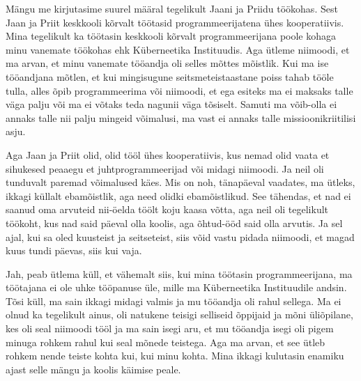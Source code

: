 
Mängu me kirjutasime suurel määral tegelikult Jaani 
ja Priidu töökohas. Sest Jaan ja Priit keskkooli 
kõrvalt töötasid programmeerijatena ühes kooperatiivis. Mina tegelikult ka 
töötasin keskkooli kõrvalt programmeerijana poole kohaga minu vanemate töökohas 
ehk Küberneetika Instituudis. Aga  ütleme 
niimoodi, et ma arvan, et  minu vanemate tööandja oli selles mõttes mõistlik. 
Kui ma ise tööandjana mõtlen, et kui mingisugune seitsmeteistaastane poiss 
tahab tööle tulla,  alles õpib programmeerima või niimoodi, et ega esiteks ma 
ei maksaks talle väga palju või ma ei võtaks teda nagunii väga tõsiselt.  
Samuti ma võib-olla ei annaks talle nii palju mingeid võimalusi, ma vast ei 
annaks talle missioonikriitilisi asju. 

Aga Jaan ja Priit olid, olid tööl ühes kooperatiivis, kus nemad olid vaata et 
sihukesed peaaegu et juhtprogrammeerijad või midagi niimoodi.  Ja neil oli 
tunduvalt paremad võimalused  käes. Mis on noh, tänapäeval vaadates, ma ütleks, 
ikkagi küllalt ebamõistlik, aga need olidki  ebamõistlikud. See tähendas, et 
nad ei saanud oma arvuteid nii-öelda töölt koju kaasa võtta, aga neil oli 
tegelikult töökoht, kus nad said päeval  olla koolis, aga õhtud-ööd said olla 
arvutis. Ja sel ajal,  kui sa oled kuusteist ja seitseteist, siis võid vastu 
pidada niimoodi, et magad kuus tundi päevas, siis kui vaja.


Jah, peab ütlema küll,  et vähemalt siis, kui mina töötasin programmeerijana, 
ma töötajana ei ole uhke tööpanuse üle, mille ma Küberneetika Instituudile 
andsin. Tõsi küll,  ma sain ikkagi midagi valmis 
ja mu tööandja oli rahul sellega. Ma ei olnud ka tegelikult ainus, oli natukene 
teisigi selliseid õppijaid ja mõni üliõpilane, kes oli seal niimoodi tööl ja ma 
sain isegi aru, et mu tööandja isegi oli pigem minuga rohkem rahul kui seal 
mõnede teistega. Aga ma arvan, et see ütleb rohkem nende teiste kohta kui, kui 
minu kohta. Mina ikkagi kulutasin enamiku ajast selle mängu ja koolis käimise 
peale.

